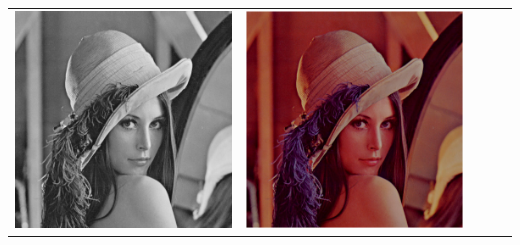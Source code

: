 \documentclass{beamer}
\begin{document}
\begin{frame}
\begin{tabular}{ccccc}
    \includegraphics[scale=.1]{../images/62.jpg} &
    \includegraphics[scale=.1]{../images/63.jpg} &

\end{tabular}
\end{frame}
\end{document}
